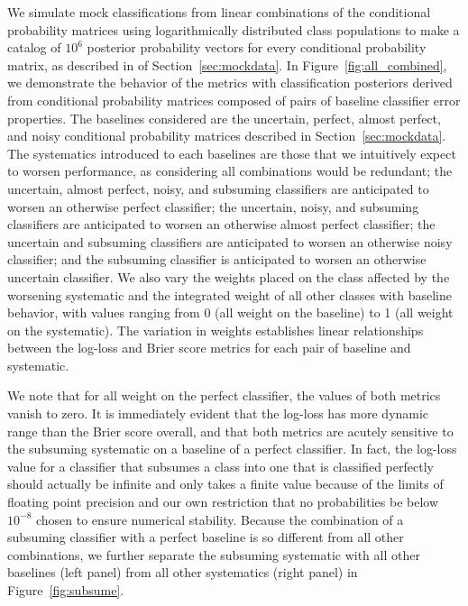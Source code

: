 We simulate mock classifications from linear combinations of the conditional probability matrices using logarithmically distributed class populations to make a catalog of $10^{6}$ posterior probability vectors for every conditional probability matrix, as described in of Section~\ref{sec:mockdata}.
In Figure~\ref{fig:all_combined}, we demonstrate the behavior of the metrics with classification posteriors derived from conditional probability matrices composed of pairs of baseline classifier error properties.
The baselines considered are the uncertain, perfect, almost perfect, and noisy conditional probability matrices described in Section~\ref{sec:mockdata}.
The systematics introduced to each baselines are those that we intuitively expect to worsen performance, as considering all combinations would be redundant;
the uncertain, almost perfect, noisy, and subsuming classifiers are anticipated to worsen an otherwise perfect classifier;
the uncertain, noisy, and subsuming classifiers are anticipated to worsen an otherwise almost perfect classifier;
the uncertain and subsuming classifiers are anticipated to worsen an otherwise noisy classifier;
and the subsuming classifier is anticipated to worsen an otherwise uncertain classifier.
We also vary the weights placed on the class affected by the worsening systematic and the integrated weight of all other classes with baseline behavior, with values ranging from 0 (all weight on the baseline) to 1 (all weight on the systematic).
The variation in weights establishes linear relationships between the log-loss and Brier score metrics for each pair of baseline and systematic.

We note that for all weight on the perfect classifier, the values of both metrics vanish to zero.
It is immediately evident that the log-loss has more dynamic range than the Brier score overall, and that both metrics are acutely sensitive to the subsuming systematic on a baseline of a perfect classifier.
In fact, the log-loss value for a classifier that subsumes a class into one that is classified perfectly should actually be infinite and only takes a finite value because of the limits of floating point precision and our own restriction that no probabilities be below $10^{-8}$ chosen to ensure numerical stability.
Because the combination of a subsuming classifier with a perfect baseline is so different from all other combinations, we further separate the subsuming systematic with all other baselines (left panel) from all other systematics (right panel) in Figure~\ref{fig:subsume}.

